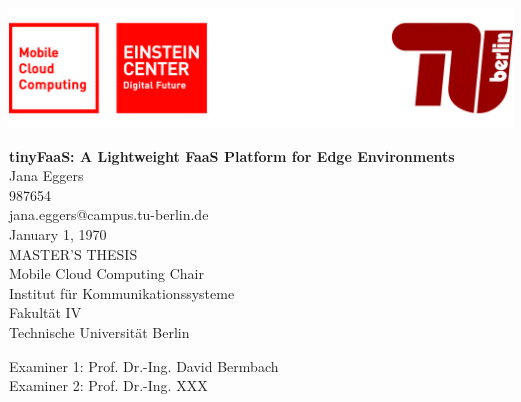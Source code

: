 
\thispagestyle{empty}

\includegraphics[width=\linewidth]{fig/Logo_Header}
\mbox{}\\[1pc]
\begin{center}
    \huge{ \bfseries tinyFaaS: A Lightweight FaaS Platform for Edge Environments}\\[2pc]

    \Large{Jana Eggers}\\
    \large{987654}\\
    \large{jana.eggers@campus.tu-berlin.de}\\[1pc]
    \large{January 1, 1970}\\[2pc]

    MASTER'S THESIS\\
    Mobile Cloud Computing Chair\\
    Institut für Kommunikationssysteme\\
    Fakultät IV\\
    Technische Universität Berlin
\end{center}
\vfill

Examiner 1: Prof. Dr.-Ing. David Bermbach
\hfill{}\\
Examiner 2: Prof. Dr.-Ing. XXX

\afterpage{\null\thispagestyle{empty}\newpage}
